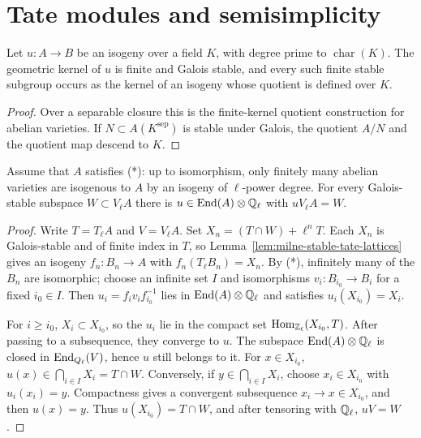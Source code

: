 \section{Tate modules and semisimplicity}

\begin{lemma}
\label{lem:milne-finite-level-tate}

Let $u:A\to B$ be an isogeny over a field $K$, with degree prime to
$\operatorname{char}(K)$.  The geometric kernel of $u$ is finite and Galois
stable, and every such finite stable subgroup occurs as the kernel of an
isogeny whose quotient is defined over $K$.
\end{lemma}

\begin{proof}

Over a separable closure this is the finite-kernel quotient construction for
abelian varieties.  If $N\subset A(K^{\mathrm{sep}})$ is stable under Galois,
the quotient $A/N$ and the quotient map descend to $K$.

\end{proof}


\begin{lemma}
\label{lem:milne-stable-tate-subspace}

Assume that $A$ satisfies (*): up to isomorphism, only finitely many abelian
varieties are isogenous to $A$ by an isogeny of $\ell$-power degree.  For every
Galois-stable subspace $W\subset V_\ell A$ there is
$u\in\operatorname{End}(A)\otimes\mathbb{Q}_\ell$ with $uV_\ell A=W$.
\end{lemma}

\begin{proof}

Write $T=T_\ell A$ and $V=V_\ell A$.  Set
$X_n=(T\cap W)+\ell^nT$.  Each $X_n$ is Galois-stable and of finite index in
$T$, so Lemma~\ref{lem:milne-stable-tate-lattices} gives an isogeny
$f_n:B_n\to A$ with $f_n(T_\ell B_n)=X_n$.  By (*), infinitely many of the
$B_n$ are isomorphic; choose an infinite set $I$ and isomorphisms
$v_i:B_{i_0}\to B_i$ for a fixed $i_0\in I$.  Then
$u_i=f_i v_i f_{i_0}^{-1}$ lies in $\operatorname{End}(A)\otimes\mathbb{Q}_\ell$ and satisfies
$u_i(X_{i_0})=X_i$.

For $i\ge i_0$, $X_i\subset X_{i_0}$, so the $u_i$ lie in the compact set
$\operatorname{Hom}_{\mathbb Z_\ell}(X_{i_0},T)$.  After passing to a subsequence, they
converge to $u$.  The subspace $\operatorname{End}(A)\otimes\mathbb{Q}_\ell$ is closed in
$\operatorname{End}_{Q_\ell}(V)$, hence $u$ still belongs to it.  For $x\in X_{i_0}$,
$u(x)\in\bigcap_{i\in I}X_i=T\cap W$.  Conversely, if
$y\in\bigcap_{i\in I}X_i$, choose $x_i\in X_{i_0}$ with $u_i(x_i)=y$.
Compactness gives a convergent subsequence $x_i\to x\in X_{i_0}$, and then
$u(x)=y$.  Thus $u(X_{i_0})=T\cap W$, and after tensoring with $\mathbb{Q}_\ell$,
$uV=W$.

\end{proof}


